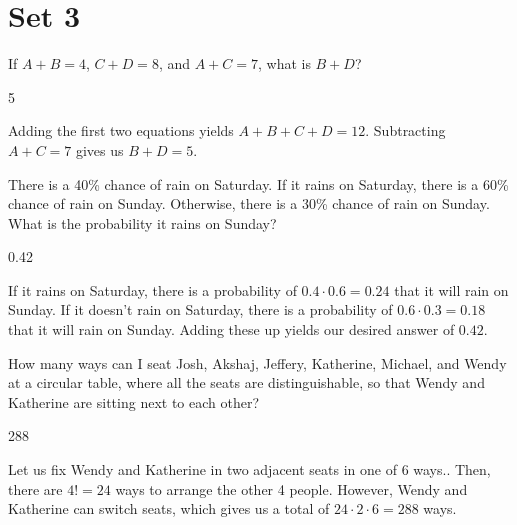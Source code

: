 \documentclass[11pt]{article}
\begin{document}
\newpage
\section*{Set 3}
\begin{problem}
If $A+B=4$, $C+D=8$, and $A+C=7$, what is $B+D$?
\end{problem}

\begin{answer}
5
\end{answer}

\begin{solution}
Adding the first two equations yields $A+B+C+D=12$. Subtracting $A+C=7$ gives us $B+D=\boxed{5}$.
\end{solution}

\begin{problem}
There is a 40\% chance of rain on Saturday. If it rains on Saturday, there is a 60\% chance of rain on Sunday. Otherwise, there is a 30\% chance of rain on Sunday. What is the probability it rains on Sunday?
\end{problem}

\begin{answer}
0.42
\end{answer}

\begin{solution}
If it rains on Saturday, there is a probability of $0.4 \cdot 0.6 =  0.24$ that it will rain on Sunday. If it doesn't rain on Saturday, there is a probability of $0.6 \cdot 0.3 = 0.18$ that it will rain on Sunday. Adding these up yields our desired answer of $\boxed{0.42}$.
\end{solution}

\begin{problem}
How many ways can I seat Josh, Akshaj, Jeffery, Katherine, Michael, and Wendy at a circular table, where all the seats are distinguishable,
so that Wendy and Katherine are sitting next to each other?
\end{problem}

\begin{answer}
288
\end{answer}

\begin{solution}
Let us fix Wendy and Katherine in two adjacent seats in one of $6$ ways.. Then, there are $4!=24$ ways to arrange the other 4 people. 
However, Wendy and Katherine can switch seats, which gives us a total of $24 \cdot 2 \cdot 6 = \boxed{288}$ ways.
\end{solution}
\end{document}
